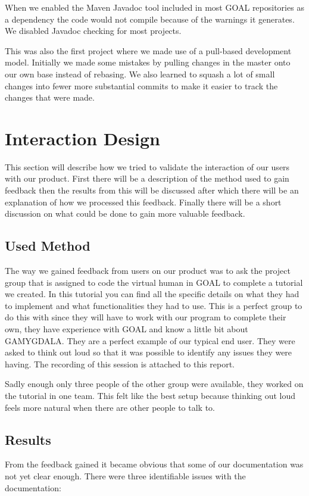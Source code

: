 \documentclass[11pt]{article}
\begin{document}
When we enabled the Maven Javadoc tool included in most GOAL repositories as a dependency the code would not compile because of the warnings it generates. We disabled Javadoc checking for most projects.\par
This was also the first project where we made use of a pull-based development model. Initially we made some mistakes by pulling changes in the master onto our own base instead of rebasing. We also learned to squash a lot of small changes into fewer more substantial commits to make it easier to track the changes that were made. 
\clearpage

\section{Interaction Design}
This section will describe how we tried to validate the interaction of our users with our product. First there will be a description of the method used to gain feedback then the results from this will be discussed after which there will be an explanation of how we processed this feedback. Finally there will be a short discussion on what could be done to gain more valuable feedback.

\subsection{Used Method}
The way we gained feedback from users on our product was to ask the project group that is assigned to code the virtual human in GOAL to complete a tutorial\cite{tutorial} we created. In this tutorial you can find all the specific details on what they had to implement and what functionalities they had to use. This is a perfect group to do this with since they will have to work with our program to complete their own, they have experience with GOAL and know a little bit about GAMYGDALA. They are a perfect example of our typical end user. They were asked to think out loud so that it was possible to identify any issues they were having. The recording of this session is attached to this report.

Sadly enough only three people of the other group were available, they worked on the tutorial in one team. This felt like the best setup because thinking out loud feels more natural when there are other people to talk to.

\subsection{Results}
From the feedback gained it became obvious that some of our documentation was not yet clear enough. There were three identifiable issues with the documentation:
\end{document}
